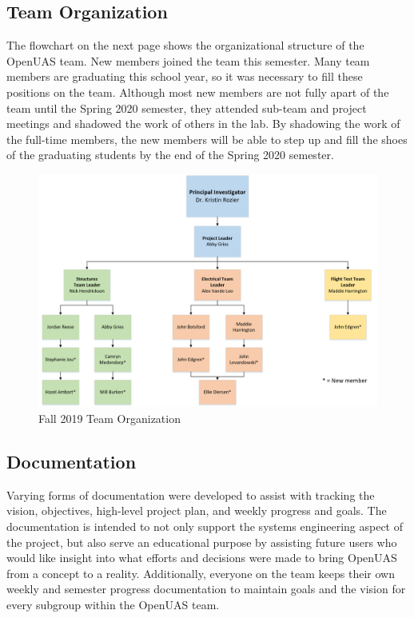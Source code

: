 \documentclass{article}
\begin{document}
\subsection{Team Organization}
The flowchart on the next page shows the organizational structure of the OpenUAS team. New members joined the team this semester. Many team members are graduating this school year, so it was necessary to fill these positions on the team. Although most new members are not fully apart of the team until the Spring 2020 semester, they attended sub-team and project meetings and shadowed the work of others in the lab. By shadowing the work of the full-time members, the new members will be able to step up and fill the shoes of the graduating students by the end of the Spring 2020 semester. 
\newpage
\begin{landscape}

\begin{figure}[!h]
\begin{center}
	\includegraphics[scale=0.75]{TeamOrganization_Fall2019.png}
	\caption{Fall 2019 Team Organization}
	\label{Figure 1:}
\end{center}
\end{figure}

\end{landscape}

\subsection{Documentation}

Varying forms of documentation were developed to assist with tracking the vision, objectives, high-level project plan, and weekly progress and goals. The documentation is intended to not only support the systems engineering aspect of the project, but also serve an educational purpose by assisting future users who would like insight into what efforts and decisions were made to bring OpenUAS from a concept to a reality. Additionally, everyone on the team keeps their own weekly and semester progress documentation to maintain goals and the vision for every subgroup within the OpenUAS team. 
\end{document}
